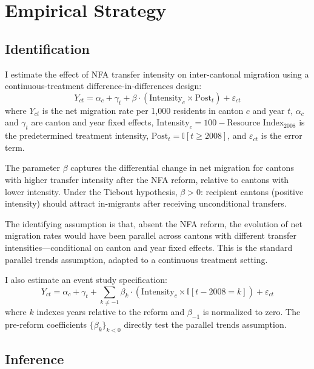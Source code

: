 \documentclass[12pt]{article}
\newcommand{\ind}{\mathbb{I}}
\begin{document}



\section{Empirical Strategy}
\label{sec:strategy}

\subsection{Identification}

I estimate the effect of NFA transfer intensity on inter-cantonal migration using a continuous-treatment difference-in-differences design:
\begin{equation}
Y_{ct} = \alpha_c + \gamma_t + \beta \cdot (\text{Intensity}_c \times \text{Post}_t) + \varepsilon_{ct}
\label{eq:main}
\end{equation}
where $Y_{ct}$ is the net migration rate per 1,000 residents in canton $c$ and year $t$, $\alpha_c$ and $\gamma_t$ are canton and year fixed effects, $\text{Intensity}_c = 100 - \text{Resource Index}_{2008}$ is the predetermined treatment intensity, $\text{Post}_t = \ind[t \geq 2008]$, and $\varepsilon_{ct}$ is the error term.

The parameter $\beta$ captures the differential change in net migration for cantons with higher transfer intensity after the NFA reform, relative to cantons with lower intensity. Under the Tiebout hypothesis, $\beta > 0$: recipient cantons (positive intensity) should attract in-migrants after receiving unconditional transfers.

The identifying assumption is that, absent the NFA reform, the evolution of net migration rates would have been parallel across cantons with different transfer intensities---conditional on canton and year fixed effects. This is the standard parallel trends assumption, adapted to a continuous treatment setting.

I also estimate an event study specification:
\begin{equation}
Y_{ct} = \alpha_c + \gamma_t + \sum_{k \neq -1} \beta_k \cdot (\text{Intensity}_c \times \ind[t - 2008 = k]) + \varepsilon_{ct}
\label{eq:eventstudy}
\end{equation}
where $k$ indexes years relative to the reform and $\beta_{-1}$ is normalized to zero. The pre-reform coefficients $\{\beta_k\}_{k<0}$ directly test the parallel trends assumption.

\subsection{Inference}
\end{document}
